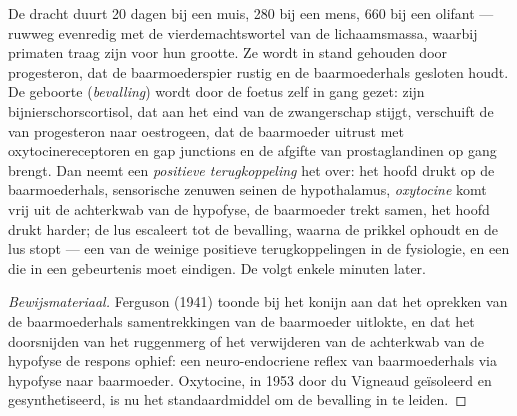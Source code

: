 \begin{proposition}\label{prop:b2:mammal-reproduction:birth}
De dracht duurt \num{20} dagen bij een muis, \num{280} bij een mens,
\num{660} bij een olifant --- ruwweg evenredig met de vierdemachtswortel
van de lichaamsmassa, waarbij primaten traag zijn voor hun grootte. Ze
wordt in stand gehouden door progesteron, dat de baarmoederspier rustig en
de baarmoederhals gesloten houdt. De geboorte (\emph{bevalling}) wordt door
de foetus zelf in gang gezet: zijn bijnierschorscortisol, dat aan het eind
van de zwangerschap stijgt, verschuift de  van progesteron naar
oestrogeen, dat de baarmoeder uitrust met oxytocinereceptoren en gap
junctions en de afgifte van prostaglandinen op gang brengt. Dan neemt een
\emph{positieve terugkoppeling} het over: het hoofd drukt op de
baarmoederhals, sensorische zenuwen seinen de hypothalamus, \emph{oxytocine}
komt vrij uit de achterkwab van de hypofyse, de baarmoeder trekt samen, het
hoofd drukt harder; de lus escaleert tot de bevalling, waarna de prikkel
ophoudt en de lus stopt --- een van de weinige positieve terugkoppelingen
in de fysiologie, en een die in een gebeurtenis moet eindigen. De 
volgt enkele minuten later.
\end{proposition}
\begin{proof}[Bewijsmateriaal]
Ferguson (1941) toonde bij het konijn aan dat het oprekken van de
baarmoederhals samentrekkingen van de baarmoeder uitlokte, en dat het
doorsnijden van het ruggenmerg of het verwijderen van de achterkwab van de
hypofyse de respons ophief: een neuro-endocriene reflex van baarmoederhals
via hypofyse naar baarmoeder. Oxytocine, in 1953 door du Vigneaud
geïsoleerd en gesynthetiseerd, is nu het standaardmiddel om de bevalling in
te leiden.
\end{proof}


